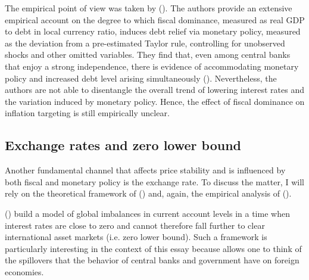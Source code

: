 \documentclass[american]{scrartcl}
\newcommand{\citein}[1]{\citeauthor{#1} (\citeyear{#1})}
\begin{document}
The empirical point of view was taken by \citein{Ahmed2021}. The authors provide an extensive empirical account on the degree to which fiscal dominance, measured as real GDP to debt in local currency ratio, induces debt relief via monetary policy, measured as the deviation from a pre-estimated Taylor rule, controlling for unobserved shocks and other omitted variables. They find that, even among central banks that enjoy a strong independence, there is evidence of accommodating monetary policy and increased debt level arising simultaneously (\cite[p. 19]{Ahmed2021}). Nevertheless, the authors are not able to disentangle the overall trend of lowering interest rates and the variation induced by monetary policy. Hence, the effect of fiscal dominance on inflation targeting is still empirically unclear.

\subsection{Exchange rates and zero lower bound} \label{caballero}

Another fundamental channel that affects price stability and is influenced by both fiscal and monetary policy is the exchange rate. To discuss the matter, I will rely on the theoretical framework of \citein{Caballero2016} and, again, the empirical analysis of \citein{Ahmed2021}.

\citein{Caballero2016} build a model of global imbalances in current account levels in a time when interest rates are close to zero and cannot therefore fall further to clear international asset markets (i.e. zero lower bound). Such a framework is particularly interesting in the context of this essay because allows one to think of the spillovers that the behavior of central banks and government have on foreign economies.
\end{document}

